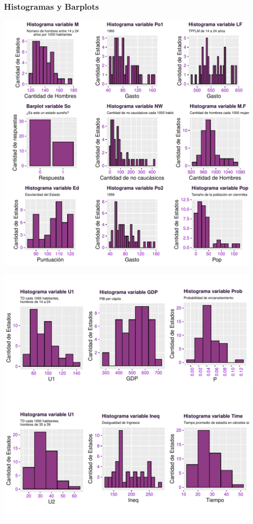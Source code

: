\documentclass[11pt,a4paper]{article}\usepackage[]{graphicx}\usepackage[]{color}
\makeatletter
\def\maxwidth{ %
  \ifdim\Gin@nat@width>\linewidth
    \linewidth
  \else
    \Gin@nat@width
  \fi
}
\newenvironment{knitrout}{}{} %
\makeatother
\begin{document}
\subsubsection{Histogramas y Barplots}
\centering
\begin{knitrout}
\color{fgcolor}
\includegraphics[width=\maxwidth]{figure/unnamed-chunk-3-1} 

\end{knitrout}
\newpage
\centering
\begin{knitrout}
\color{fgcolor}
\includegraphics[width=\maxwidth]{figure/unnamed-chunk-4-1} 

\end{knitrout}
\newpage
\end{document}
